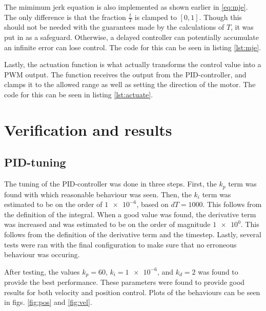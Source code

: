 \documentclass[11pt]{article}
\begin{document}
The mimimum jerk equation is also implemented as shown earlier  in \vref{eq:mje}. The only difference is that the fraction $\frac{t}{T}$ is clamped to $[0,1]$. Though this should not be needed with the guarantees made by the calculations of $T$, it was put in as a safeguard. Otherwise, a delayed controller can potentially accumulate an infinite error can lose control. The code for this can be seen in listing \vref{lst:mje}.\par



Lastly, the actuation function is what actually transforms the control value into a PWM output. The function receives the output from the PID-controller, and clamps it to the allowed range as well as setting the direction of the motor. The code for this can be seen in listing \vref{lst:actuate}.




\section{Verification and results}
\subsection{PID-tuning}
The tuning of the PID-controller was done in three steps. First, the $k_p$ term was found with which reasonable behaviour was seen. Then, the $k_i$ term was estimated to be on the order of $\num{1e-6}$, based on $dT=1000$. This follows from the definition of the integral. When a good value was found, the derivative term was increased and was estimated to be on the order of magnitude $\num{1e0}$. This follows from the definition of the derivative term and the timestep. Lastly, several tests were ran with the final configuration to make sure that no erroneous behaviour was occuring. \par

After testing, the values $k_p = 60$, $k_i = \num{1e-6}$, and $k_d = 2$ was found to provide the best performance. These parameters were found to provide good results for both velocity and position control. Plots of the behaviours can be seen in figs. \ref{fig:pos} and \vref{fig:vel}. \par
\end{document}
